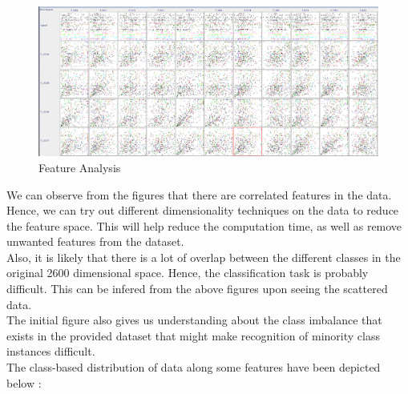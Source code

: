 \documentclass[12pt]{report}
\begin{document}
\begin{figure}[H]
  \centering
  \includegraphics[width=1\textwidth]{matrix1.png}
  \caption{Feature Analysis}
\end{figure}

We can observe from the figures that there are correlated features in the data. Hence, we can try out different dimensionality techniques on the data to reduce the feature space. This will help reduce the computation time, as well as remove unwanted features from the dataset.\\ 

Also, it is likely that there is a lot of overlap between the different classes in the original 2600 dimensional space. Hence, the classification task is probably difficult. This can be infered from the above figures upon seeing the scattered data.\\

The initial figure also gives us understanding about the class imbalance that exists in the provided dataset that might make recognition of minority class instances difficult.\\

The class-based distribution of data along some features have been depicted below :
\end{document}
